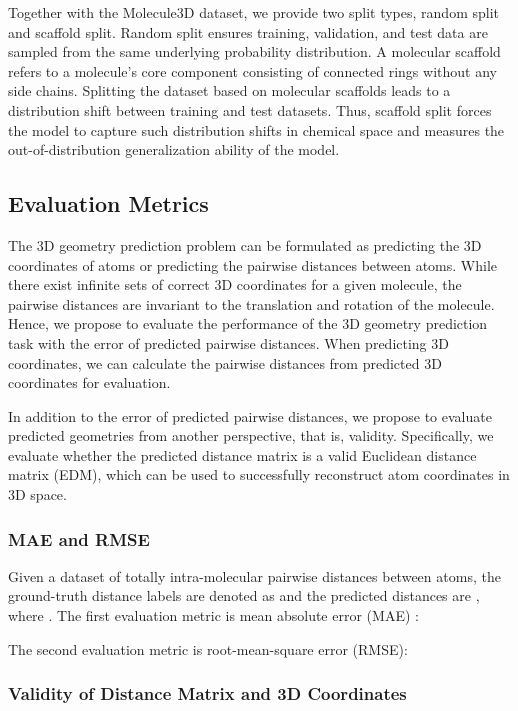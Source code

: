 \documentclass{article}
\begin{document}
Together with the Molecule3D dataset, we provide two split types, random split and scaffold split. Random split ensures training, validation, and test data are sampled from the same underlying probability distribution. A molecular scaffold refers to a molecule's core component consisting of connected rings without any side chains. Splitting the dataset based on molecular scaffolds leads to a distribution shift between training and test datasets. Thus, scaffold split forces the model to capture such distribution shifts in chemical space and measures the out-of-distribution generalization ability of the model. 


\subsection{Evaluation Metrics}
The 3D geometry prediction problem can be formulated as predicting the 3D coordinates of atoms or predicting the pairwise distances between atoms. While there exist infinite sets of correct 3D coordinates for a given molecule, the pairwise distances are invariant to the translation and rotation of the molecule. Hence, we propose to evaluate the performance of the 3D geometry prediction task with the error of predicted pairwise distances. When predicting 3D coordinates, we can calculate the pairwise distances from predicted 3D coordinates for evaluation.

In addition to the error of predicted pairwise distances, we propose to evaluate predicted geometries from another perspective, that is, validity. Specifically, we evaluate whether the predicted distance matrix is a valid Euclidean distance matrix (EDM), which can be used to successfully reconstruct atom coordinates in 3D space. 

\subsubsection{MAE and RMSE}
Given a dataset of totally  intra-molecular pairwise distances between atoms, the ground-truth distance labels are denoted as  and the predicted distances are , where . The first evaluation metric is mean absolute error (\textsc{MAE}) \cite{willmott2005advantages}:


The second evaluation metric is root-mean-square error (\textsc{RMSE}):


\subsubsection{Validity of Distance Matrix and 3D Coordinates}
\label{sec:validity}
\end{document}
